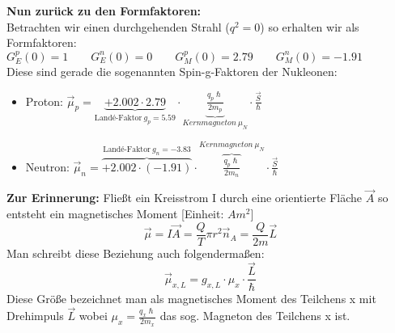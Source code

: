 \documentclass[Ex4_Zusammenfassung.tex]{subfiles}
\begin{document}
\textbf{Nun zurück zu den Formfaktoren:} \\ \newline
Betrachten wir einen durchgehenden Strahl ($q^2=0$) so erhalten wir als Formfaktoren: 
$G_E^p(0)=1 \qquad G_E^n(0)=0 \qquad G_M^p(0)=2.79 \qquad G_M^n(0) = -1.91 $ \\ \newline
Diese sind gerade die sogenannten Spin-g-Faktoren der Nukleonen:
\begin{itemize}
\item Proton: $\vec \mu_p = \underbrace{+2.002 \cdot 2.79}_{\text{Landé-Faktor} \ g_p=5.59} \cdot \underbrace{\frac{q_p \hslash}{2m_p}}_{Kernmagneton \  \mu_N} \cdot \frac{\vec S}{\hslash} $
\item Neutron: $\vec \mu_n = \overbrace{+2.002 \cdot (-1.91)}^{\text{Landé-Faktor} \ g_n=-3.83} \cdot \overbrace{\frac{q_p \hslash}{2 m_n}}^{Kernmagneton \  \mu_N} \cdot \frac{\vec S}{\hslash} $
\end{itemize} \newpage
\textbf{Zur Erinnerung:} \newline
Fließt ein Kreisstrom I durch eine orientierte Fläche $\vec A$ so entsteht ein magnetisches Moment [Einheit: $Am^2$]
\begin{equation}
\vec \mu = I \vec A = \frac{Q}{T} \pi r^2 \vec n_A = \frac{Q}{2m} \vec L 
\end{equation}
Man schreibt diese Beziehung auch folgendermaßen:
\begin{equation}
\vec \mu_{x,L} = g_{x,L} \cdot \mu_x \cdot \frac{\vec L}{\hslash}
\end{equation}
Diese Größe bezeichnet man als magnetisches Moment des Teilchens x mit Drehimpuls $\vec L$ wobei $\mu_x = \frac{q_x \hslash}{2 m_x}$ das sog. Magneton des Teilchens x ist. 
\end{document}
